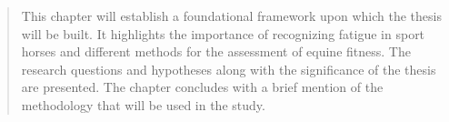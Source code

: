 \begin{quote}

This chapter will establish a foundational framework upon which the thesis will be built. It highlights the importance of recognizing fatigue in sport horses and different methods for the assessment of equine fitness. The research questions and hypotheses along with the significance of the thesis are presented. The chapter concludes with a brief mention of the methodology that will be used in the study.




\end{quote}